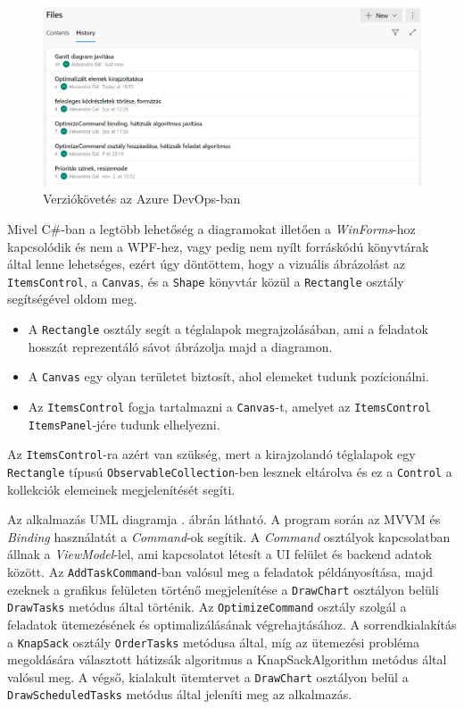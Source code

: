 \begin{figure}[h]
	\centering
	\includegraphics[scale=0.5]{images/azureHistory.png}
	\caption{Verziókövetés az Azure DevOps-ban}
	\label{fig:azureHistory}
\end{figure}


Mivel C\#-ban a legtöbb lehetőség a diagramokat illetően a \textit{WinForms}-hoz kapcsolódik és nem a WPF-hez, vagy pedig nem nyílt forráskódú könyvtárak által lenne lehetséges, ezért úgy döntöttem, hogy a vizuális ábrázolást az \texttt{ItemsControl}, a \texttt{Canvas}, és a \texttt{Shape} könyvtár közül a \texttt{Rectangle} osztály segítségével oldom meg.
\begin{itemize}
	\item A \texttt{Rectangle} osztály segít a téglalapok megrajzolásában, ami a feladatok hosszát reprezentáló sávot ábrázolja majd a diagramon.
	\item A \texttt{Canvas} egy olyan területet biztosít, ahol elemeket tudunk pozícionálni.
	\item Az \texttt{ItemsControl} fogja tartalmazni a \texttt{Canvas}-t, amelyet az \texttt{ItemsControl} \\ \texttt{ItemsPanel}-jére tudunk elhelyezni.
\end{itemize}
Az \texttt{ItemsControl}-ra azért van szükség, mert a kirajzolandó téglalapok egy \texttt{Rectangle} típusú \texttt{ObservableCollection}-ben lesznek eltárolva és ez a \texttt{Control} a kollekciók elemeinek megjelenítését segíti.


Az alkalmazás UML diagramja . ábrán látható. A program során az MVVM és \textit{Binding} használatát a \textit{Command}-ok segítik. A \textit{Command} osztályok kapcsolatban állnak a \textit{ViewModel}-lel, ami kapcsolatot létesít a UI felület és backend adatok között. Az \texttt{AddTaskCommand}-ban valósul meg a feladatok példányosítása, majd ezeknek a grafikus felületen történő megjelenítése a \texttt{DrawChart} osztályon belüli \texttt{DrawTasks} metódus által történik. Az \texttt{OptimizeCommand} osztály szolgál a feladatok ütemezésének és optimalizálásának végrehajtásához. A sorrendkialakítás a \texttt{KnapSack} osztály \texttt{OrderTasks} metódusa által, míg az ütemezési probléma megoldására választott hátizsák algoritmus a KnapSackAlgorithm metódus által valósul meg. A végső, kialakult ütemtervet a \texttt{DrawChart} osztályon belül a \texttt{DrawScheduledTasks} metódus által jeleníti meg az alkalmazás.

